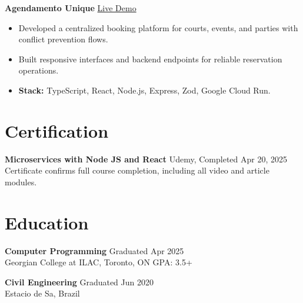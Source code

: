 \documentclass[letterpaper,12pt]{fed-res}
\begin{document}
\textbf{Agendamento Unique} \hfill
\href{https://agendamento-unique-655344779408.northamerica-northeast2.run.app/}{Live Demo}
\begin{itemize}[leftmargin=0.15in]
  \item Developed a centralized booking platform for courts, events, and parties with conflict prevention flows.
  \item Built responsive interfaces and backend endpoints for reliable reservation operations.
  \item \textbf{Stack:} TypeScript, React, Node.js, Express, Zod, Google Cloud Run.
\end{itemize}

\section{Certification}
\textbf{Microservices with Node JS and React} \hfill Udemy, Completed Apr 20, 2025 \\
Certificate confirms full course completion, including all video and article modules.

\section{Education}
\textbf{Computer Programming} \hfill Graduated Apr 2025 \\
Georgian College at ILAC, Toronto, ON \hfill GPA: 3.5+

\textbf{Civil Engineering} \hfill Graduated Jun 2020 \\
Estacio de Sa, Brazil
\end{document}
